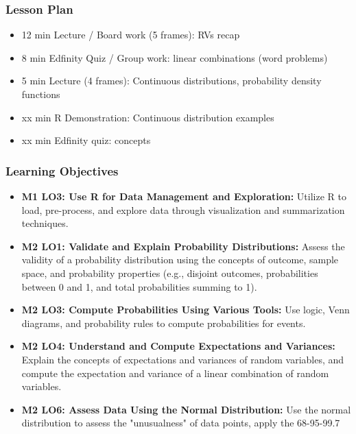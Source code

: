\begin{frame}
    \frametitle{Lesson Plan}
    \begin{itemize}
        \item 12 min Lecture / Board work (5 frames): RVs recap
        \item 8 min Edfinity Quiz / Group work: linear combinations (word problems)
        \item 5 min Lecture (4 frames): Continuous distributions, probability density functions
        \item xx min R Demonstration: Continuous distribution examples
        \item xx min Edfinity quiz: concepts
    \end{itemize}
\end{frame}

\begin{frame}
    \frametitle{Learning Objectives}
    \begin{itemize}
        \item \textbf{M1 LO3: Use R for Data Management and Exploration:} Utilize R to load, pre-process, and explore data through visualization and summarization techniques.
        \item \textbf{M2 LO1: Validate and Explain Probability Distributions:} Assess the validity of a probability distribution using the concepts of outcome, sample space, and probability properties (e.g., disjoint outcomes, probabilities between 0 and 1, and total probabilities summing to 1).
        \item \textbf{M2 LO3: Compute Probabilities Using Various Tools:} Use logic, Venn diagrams, and probability rules to compute probabilities for events.
        \item \textbf{M2 LO4: Understand and Compute Expectations and Variances:} Explain the concepts of expectations and variances of random variables, and compute the expectation and variance of a linear combination of random variables.
        \item \textbf{M2 LO6: Assess Data Using the Normal Distribution:} Use the normal distribution to assess the "unusualness" of data points, apply the 68-95-99.7%
    \end{itemize}
\end{frame}

